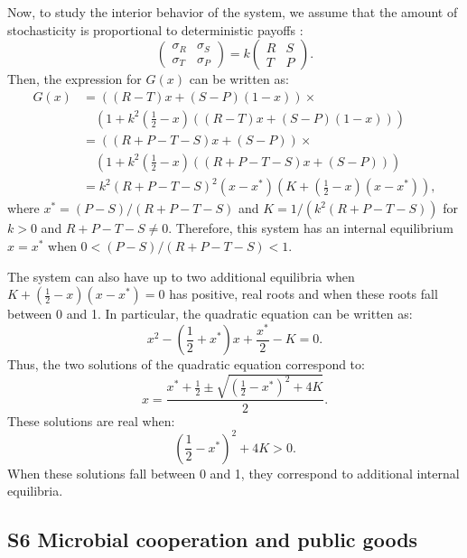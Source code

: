 \documentclass[12pt]{article}
\begin{document}
Now, to study the interior behavior of the system, we assume that the amount of stochasticity is proportional to deterministic payoffs \citep{wang2025evolution}:
\begin{equation}
 \begin{pmatrix}
\sigma_R & \sigma_S \\
\sigma_T & \sigma_P
\end{pmatrix} =k \begin{pmatrix}
R & S \\
T & P
\end{pmatrix}.
\end{equation}
Then, the expression for $G(x)$ can be written as:
\begin{align}
G(x) &= \left( (R-T)x + (S-P)(1-x) \right) \times\\
&\quad{}\left(1+ k^2 \left(\frac{1}{2} - x \right) ((R-T)x + (S-P)(1-x))\right)\\
&= \left( (R+P-T-S)x + (S-P) \right) \times\\
&\quad{}\left(1+ k^2 \left(\frac{1}{2} - x \right) ((R+P-T-S)x + (S-P))\right)\\
&= k^2 (R+P-T-S)^2 \left(x-x^\ast \right) \left(K + \left(\frac{1}{2} - x \right) (x - x^\ast)\right),
\end{align}
where $x^\ast = (P-S)/(R+P-T-S)$ and $K = 1/(k^2(R+P-T-S))$ for $k > 0$ and $R + P -T - S \neq 0$.
Therefore, this system has an internal equilibrium $x=x^\ast$ when $0 < (P-S)/(R+P-T-S) < 1$.

The system can also have up to two additional equilibria when $K + \left(\frac{1}{2} - x \right) (x - x^\ast) = 0$ has positive, real roots and when these roots fall between 0 and 1.
In particular, the quadratic equation can be written as:
\begin{equation}
x^2 -\left(\frac{1}{2} + x^\ast \right) x + \frac{x^\ast}{2} - K = 0.
\end{equation}
Thus, the two solutions of the quadratic equation correspond to:
\begin{equation}
x = \frac{x^\ast + \frac{1}{2} \pm \sqrt{\left(\frac{1}{2} - x^\ast \right)^2 + 4K}}{2}.
\end{equation}
These solutions are real when:
\begin{equation}
\left(\frac{1}{2} - x^\ast \right)^2 + 4K > 0.
\end{equation}
When these solutions fall between 0 and 1, they correspond to additional internal equilibria.

\subsection*{S6 Microbial cooperation and public goods}
\end{document}
